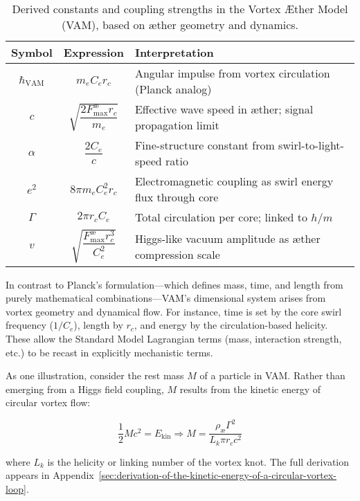 \begin{table}[H]
    \centering
    \footnotesize
    \renewcommand{\arraystretch}{1.3}
    \begin{tabular}{|c|c|l|}
        \hline
        \textbf{Symbol} & \textbf{Expression} & \textbf{Interpretation} \\
        \hline
        $\hbar_\text{VAM}$ & $m_e C_e r_c$ & Angular impulse from vortex circulation (Planck analog) \\
        \hline
        $c$ & $\sqrt{\dfrac{2 F^{\text{\ae}}_{\text{max}} r_c}{m_e}}$ & Effective wave speed in æther; signal propagation limit \\
        \hline
        $\alpha$ & $\dfrac{2 C_e}{c}$ & Fine-structure constant from swirl-to-light-speed ratio \\
        \hline
        $e^2$ & $8\pi m_e C_e^2 r_c$ & Electromagnetic coupling as swirl energy flux through core \\
        \hline
        $\Gamma$ & $2\pi r_c C_e$ & Total circulation per core; linked to $h/m$ \\
        \hline
        $v$ & $\sqrt{\dfrac{F^{\text{\ae}}_{\text{max}} r_c^3}{C_e^2}}$ & Higgs-like vacuum amplitude as æther compression scale \\
        \hline
    \end{tabular}
    \caption{Derived constants and coupling strengths in the Vortex Æther Model (VAM), based on æther geometry and dynamics.}
    \label{tab:VAM_constants}
\end{table}

In contrast to Planck’s formulation—which defines mass, time, and length from purely mathematical combinations—VAM's dimensional system arises from vortex geometry and dynamical flow. For instance, time is set by the core swirl frequency ($1/C_e$), length by $r_c$, and energy by the circulation-based helicity. These allow the Standard Model Lagrangian terms (mass, interaction strength, etc.) to be recast in explicitly mechanistic terms.

As one illustration, consider the rest mass $M$ of a particle in VAM. Rather than emerging from a Higgs field coupling, $M$ results from the kinetic energy of circular vortex flow:

\begin{equation}
    \frac{1}{2} M c^2 = E_\text{kin} \Rightarrow M = \frac{\rho_\text{\ae} \Gamma^2}{L_k \pi r_c c^2}
\end{equation}

where $L_k$ is the helicity or linking number of the vortex knot. The full derivation appears in Appendix~\ref{sec:derivation-of-the-kinetic-energy-of-a-circular-vortex-loop}.


